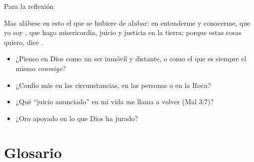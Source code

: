 \begin{frame}{Para la reflexión}
\begin{cita}Mas alábese en esto el que se hubiere de alabar: en entenderme y conocerme, que yo soy \SENOR, que hago misericordia, juicio y justicia en la tierra; porque estas cosas quiero, dice \SENOR.\end{cita}
\begin{center}\end{center}
\small
\begin{itemize}
\item ¿Pienso en Dios como un ser inmóvil y distante, o como el que es siempre el mismo \emph{conmigo}?
\item ¿Confío más en las circunstancias, en las personas o en la Roca?
\item ¿Qué ``juicio anunciado'' en mi vida me llama a volver (Mal 3:7)?
\item ¿Oro apoyado en lo que Dios ha jurado?
\end{itemize}
\end{frame}

\section{Glosario}

